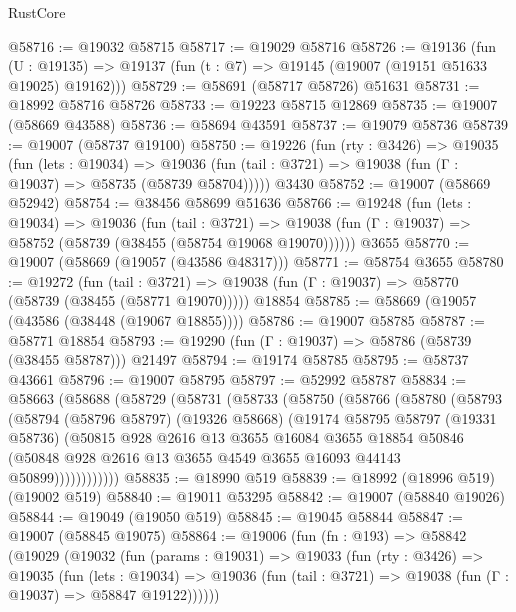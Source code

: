 \begin{lexlean}{RustCore}
\begin{coremodule}
@58716 := @19032 @58715
@58717 := @19029 @58716
@58726 := @19136
    (fun (U : @19135) => @19137 (fun (t : @7) => @19145 (@19007 (@19151 @51633 @19025) @19162)))
@58729 := @58691 (@58717 @58726) @51631
@58731 := @18992 @58716 @58726
@58733 := @19223 @58715 @12869
@58735 := @19007 (@58669 @43588)
@58736 := @58694 @43591
@58737 := @19079 @58736
@58739 := @19007 (@58737 @19100)
@58750 := @19226
    (fun (rty : @3426) =>
    @19035
      (fun (lets : @19034) =>
      @19036 (fun (tail : @3721) => @19038 (fun (Γ : @19037) => @58735 (@58739 @58704)))))
    @3430
@58752 := @19007 (@58669 @52942)
@58754 := @38456 @58699 @51636
@58766 := @19248
    (fun (lets : @19034) =>
    @19036
      (fun (tail : @3721) =>
      @19038 (fun (Γ : @19037) => @58752 (@58739 (@38455 (@58754 @19068 @19070))))))
    @3655
@58770 := @19007 (@58669 (@19057 (@43586 @48317)))
@58771 := @58754 @3655
@58780 := @19272
    (fun (tail : @3721) => @19038 (fun (Γ : @19037) => @58770 (@58739 (@38455 (@58771 @19070)))))
    @18854
@58785 := @58669 (@19057 (@43586 (@38448 (@19067 @18855))))
@58786 := @19007 @58785
@58787 := @58771 @18854
@58793 := @19290 (fun (Γ : @19037) => @58786 (@58739 (@38455 @58787))) @21497
@58794 := @19174 @58785
@58795 := @58737 @43661
@58796 := @19007 @58795
@58797 := @52992 @58787
@58834 := @58663
    (@58688
      (@58729
        (@58731
          (@58733
            (@58750
              (@58766
                (@58780
                  (@58793
                    (@58794
                      (@58796 @58797)
                      (@19326 @58668)
                      (@19174
                        @58795
                        @58797
                        (@19331 @58736)
                        (@50815
                          @928
                          @2616
                          @13
                          @3655
                          @16084
                          @3655
                          @18854
                          @50846
                          (@50848 @928 @2616 @13 @3655 @4549 @3655 @16093 @44143 @50899))))))))))))
@58835 := @18990 @519
@58839 := @18992 (@18996 @519) (@19002 @519)
@58840 := @19011 @53295
@58842 := @19007 (@58840 @19026)
@58844 := @19049 (@19050 @519)
@58845 := @19045 @58844
@58847 := @19007 (@58845 @19075)
@58864 := @19006
    (fun (fn : @193) =>
    @58842
      (@19029
        (@19032
          (fun (params : @19031) =>
          @19033
            (fun (rty : @3426) =>
            @19035
              (fun (lets : @19034) =>
              @19036 (fun (tail : @3721) => @19038 (fun (Γ : @19037) => @58847 @19122))))))

\end{coremodule}
\end{lexlean}
